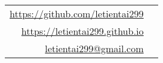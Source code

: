 { %
  \def\arraystretch{1.3}

  \begin{tabular}{
      @{} >{\centering\arraybackslash} r @{\hskip5pt}
       >{\centering\arraybackslash} l @{}
    }
    \href{https://github.com/letientai299}{https://github.com/letientai299}\\
    \href{https://letientai299.github.io}{https://letientai299.github.io}\\
    \href{mailto:letientai299@gmail.com}{letientai299@gmail.com}
  \end{tabular}
}
